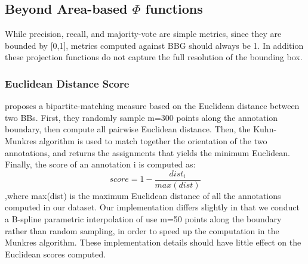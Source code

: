 \documentclass[12pt]{article}
\begin{document}
\subsection{Beyond Area-based $\Phi$ functions}
\par While precision, recall, and majority-vote are simple metrics, since they are bounded by [0,1], metrics computed against BBG should always be 1. In addition these projection functions do not capture the full resolution of the bounding box.  
\subsubsection{Euclidean Distance Score}
\par \cite{Vittayakorn2011} proposes a bipartite-matching measure based on the Euclidean distance between two BBs. First, they randomly sample m=300 points along the annotation boundary, then compute all pairwise Euclidean distance. Then, the Kuhn-Munkres algorithm is used to match together the orientation of the two annotations, and returns the assignments that yields the minimum Euclidean. Finally, the score of an annotation i is computed as:
\begin{equation}
score = 1-\frac{dist_i}{max(dist)}
\end{equation},where max(dist) is the maximum Euclidean distance of all the annotations computed in our dataset. Our implementation differs slightly in that we conduct a B-spline parametric interpolation of use m=50 points along the boundary rather than random sampling, in order to speed up the computation in the Munkres algorithm. These implementation details should have little effect on the Euclidean scores computed.



\end{document}
